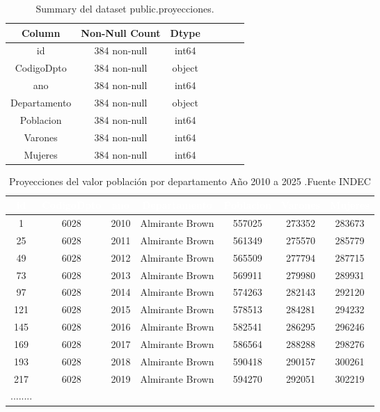 \documentclass{article}
\theoremstyle{mytheoremstyle}
\theoremstyle{mytheoremstyle}
\theoremstyle{myproblemstyle}
\begin{document}
 \begin{table}[htbp]
  \centering
  \begin{tabular}{ccccccc}
  \toprule
  \textbf{Column} & \textbf{Non-Null Count} & \textbf{Dtype} \\
  \midrule
  id            & 384 non-null & int64 \\
  CodigoDpto    & 384 non-null & object \\
  ano           & 384 non-null & int64 \\
  Departamento  & 384 non-null & object \\
  Poblacion     & 384 non-null & int64 \\
  Varones       & 384 non-null & int64 \\
  Mujeres       & 384 non-null & int64 \\
  \bottomrule
  \end{tabular}
  \caption{Summary del dataset public.proyecciones.}
  \label{tab:ProyeccSummary}
  \end{table}

  \begin{table}[htb]
    \centering
    \begin{tabular}{|c|c|c|c|c|c|c|}
    \hline
    \textbf{\cellcolor[rgb]{0,0.231,0.427}\textcolor{white}{id}} & \textbf{\cellcolor[rgb]{0,0.231,0.427}\textcolor{white}{CodigoDpto}} & \textbf{\cellcolor[rgb]{0,0.231,0.427}\textcolor{white}{ano}} & \textbf{\cellcolor[rgb]{0,0.231,0.427}\textcolor{white}{Departamento}} & \textbf{\cellcolor[rgb]{0,0.231,0.427}\textcolor{white}{Poblacion}} & \textbf{\cellcolor[rgb]{0,0.231,0.427}\textcolor{white}{Varones}} & \textbf{\cellcolor[rgb]{0,0.231,0.427}\textcolor{white}{Mujeres}} \\ \hline
    1 & 6028 & 2010 & Almirante Brown & 557025 & 273352 & 283673 \\
    25 & 6028 & 2011 & Almirante Brown & 561349 & 275570 & 285779 \\
    49 & 6028 & 2012 & Almirante Brown & 565509 & 277794 & 287715 \\
    73 & 6028 & 2013 & Almirante Brown & 569911 & 279980 & 289931 \\
    97 & 6028 & 2014 & Almirante Brown & 574263 & 282143 & 292120 \\
    121 & 6028 & 2015 & Almirante Brown & 578513 & 284281 & 294232 \\
    145 & 6028 & 2016 & Almirante Brown & 582541 & 286295 & 296246 \\
    169 & 6028 & 2017 & Almirante Brown & 586564 & 288288 & 298276 \\
    193 & 6028 & 2018 & Almirante Brown & 590418 & 290157 & 300261 \\
    217 & 6028 & 2019 & Almirante Brown & 594270 & 292051 & 302219 \\
    ........ &&&&&& \\
    \hline
    \end{tabular}
    \caption{ Proyecciones del valor población por departamento Año 2010 a 2025 .Fuente INDEC}
    \label{tab:proyecHead}
    \end{table}
\end{document}
